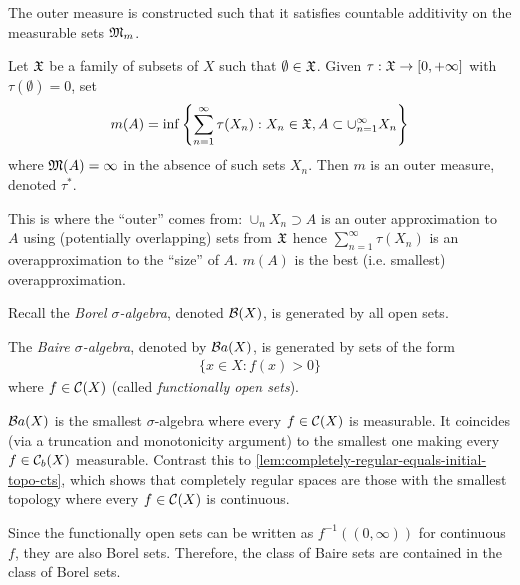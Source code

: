 \begin{remark}
  The outer measure is constructed such that it satisfies
  countable additivity on the measurable sets $\mathfrak{M}_m$.
\end{remark}

\begin{example}
  Let $\mathfrak{X}$ be a family of subsets of $X$ such that $\emptyset \in \mathfrak{X}$.
  Given $\tau : \mathfrak{X} \to [0,+\infty]$ with $\tau(\emptyset) = 0$, set
  \[
    m(A) = \inf\left\{
      \sum_{n=1}^\infty \tau(X_n) : X_n \in \mathfrak{X}, A \subset \cup_{n=1}^\infty X_n
    \right\}
  \]
  where $\mathfrak{M}(A) = \infty$ in the absence of such sets $X_n$.
  Then $m$ is an outer measure, denoted $\tau^*$.

  This is where the ``outer'' comes from: $\cup_n X_n \supset A$
  is an outer approximation to $A$ using (potentially overlapping)
  sets from $\mathfrak{X}$ hence $\sum_{n=1}^\infty \tau(X_n)$ is an overapproximation
  to the ``size'' of $A$. $m(A)$ is the best (i.e. smallest) overapproximation.
\end{example}

Recall the \emph{Borel $\sigma$-algebra}, denoted $\mathcal{B}(X)$, is generated by all
open sets.
\begin{definition}
  The \emph{Baire $\sigma$-algebra}, denoted by $\mathcal{B}a(X)$,
  is generated by sets of the form
  \begin{align}
    \label{eq:functionally-open}
    \{x \in X : f(x) > 0 \}
  \end{align}
  where $f \in \mathcal{C}(X)$ (called \emph{functionally open sets}).
\end{definition}

\begin{remark}
  $\mathcal{B}a(X)$ is the smallest $\sigma$-algebra where every $f \in \mathcal{C}(X)$ is
  measurable. It coincides (via a truncation and monotonicity argument) to
  the smallest one making every $f \in \mathcal{C}_b(X)$ measurable.
  Contrast this to \cref{lem:completely-regular-equals-initial-topo-cts}, which
  shows that completely regular spaces are those with the smallest topology
  where every $f \in \mathcal{C}(X)$ is continuous.
\end{remark}

\begin{remark}
  Since the functionally open sets can be written as $f^{-1}((0, \infty))$
  for continuous $f$, they are also Borel sets. Therefore,
  the class of Baire sets are contained in the class of Borel sets.
\end{remark}

